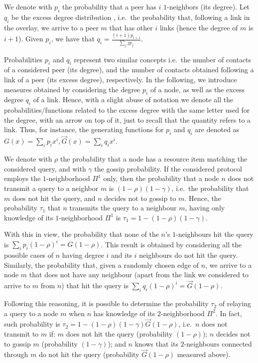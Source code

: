\documentclass{sig-alternate}
\begin{document}
We denote with $p_i$ the probability that a peer has $i$ $1$-neighbors (its degree).
Let $q_i$ be the excess degree distribution \cite{newmanHandbook}, i.e.~the probability that, following a link in the overlay, we arrive to a peer $m$ that has other $i$ links (hence the degree of $m$ is $i+1$). Given $p_i$, we have that
$q_i = \frac{(i+1)p_{i+1}}{\sum_j j p_j}.$

Probabilities $p_i$ and $q_i$ represent two similar concepts i.e.~the number of contacts of a considered peer (its degree), and the number of contacts obtained following a link of a peer (its excess degree), respectively. In the following, we introduce measures obtained by considering the degree $p_i$ of a node, as well as the excess degree $q_i$ of a link. Hence, with a slight abuse of notation we denote all the probabilities/functions related to the excess degree with the same letter used for the degree, with an arrow on top of it, just to recall that the quantity refers to a link.
Thus, for instance, the generating functions for $p_i$ and $q_i$ are denoted as $ G(x) = \sum_i p_i x^i,  \overrightarrow{G}(x) = \sum_i q_i x^i$.

We denote with $\rho$ the probability that a node has a resource item matching the considered query, and with $\gamma$ the gossip probability.
If the considered protocol employs the $1$-neighborhood $\Pi^1$ only, then the probability that a node $n$ does not transmit a query to a neighbor $m$ is $(1-\rho)(1-\gamma)$, i.e.~the probability that $m$ does not hit the query, and $n$ decides not to gossip to $m$. Hence, the probability $\tau_1$ that $n$ transmits the query to a neighbour $m$, having only knowledge of its $1$-neighborhood $\Pi^1$ is $\tau_1 = 1 - (1-\rho)(1-\gamma)$.

With this in view, the probability that none of the $n$'s $1$-neighbours hit the query is $\sum_i p_i (1-\rho)^i = G(1-\rho)$. This result is obtained by considering all the possible cases of $n$ having degree $i$ and its $i$ neighbours do not hit the query. Similarly, the probability that, given a randomly chosen edge of $n$, we arrive to a node $m$ that does not have any neighbour (apart from the link we considered to arrive to $m$ from $n$) that hit the query is $\sum_i q_i (1-\rho)^i = \overrightarrow{G}(1-\rho)$. 

Following this reasoning, it is possible to determine the probability $\tau_2$ of relaying a query to a node $m$ when $n$ has knowledge of its $2$-neighborhood $\Pi^2$. In fact, such probability is 
$\tau_2 = 1 - (1-\rho)(1-\gamma)\overrightarrow{G}(1-\rho)$, i.e.~$n$ does not transmit to $m$ if: $m$ does not hit the query (probability $(1-\rho)$); $n$ decides not to gossip $m$ (probability $(1-\gamma)$); and $n$ knows that its $2$-neighbours connected through $m$ do not hit the query (probability $\overrightarrow{G}(1-\rho)$ measured above).
\end{document}

